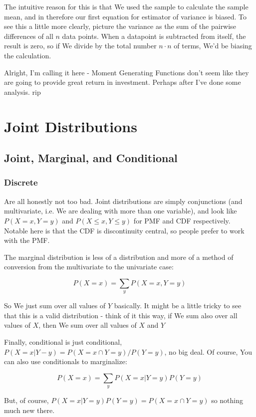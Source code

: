 \documentclass{article}
\begin{document}
		The intuitive reason for this is that We used the sample to calculate the sample mean, and in therefore our first equation for estimator of variance is biased. To see this a little more clearly, picture the variance as the sum of the pairwise differences of all $n$ data points. When a datapoint is subtracted from itself, the result is zero, so if We divide by the total number $n\cdot n$ of terms, We'd be biasing the calculation.
		
		Alright, I'm calling it here - Moment Generating Functions don't seem like they are going to provide great return in investment. Perhaps after I've done some analysis. rip
		
\section{Joint Distributions}

	\subsection{Joint, Marginal, and Conditional}
	
		\subsubsection{Discrete}
			Are all honestly not too bad. Joint distributions are simply conjunctions (and multivariate, i.e. We are dealing with more than one variable), and look like $P(X = x, Y = y)$ and $P(X\le x, Y\le y)$ for PMF and CDF respectively. Notable here is that the CDF is discontinuity central, so people prefer to work with the PMF.
		
			The marginal distribution is less of a distribution and more of a method of conversion from the multivariate to the univariate case:
			
			\[ P(X=x) = \sum_{y} P(X=x, Y=y) \]
		
			So We just sum over all values of $Y$ basically. It might be a little tricky to see that this is a valid distribution - think of it this way, if We sum also over all values of $X$, then We sum over all values of $X$ and $Y$
			
			Finally, conditional is just conditional, $P(X = x|Y - y) = P(X=x\cap Y=y)/P(Y=y)$, no big deal. Of course, You can also use conditionals to marginalize:
			
			\[ P(X=x) = \sum_y P(X=x|Y=y)P(Y=y) \]
		
			But, of course, $P(X=x|Y=y)P(Y=y) = P(X=x\cap Y=y)$ so nothing much new there.
			
\end{document}
